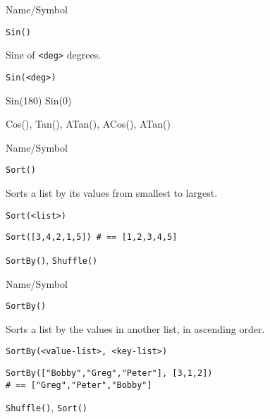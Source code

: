 \rl


\begin{desc}{Name/Symbol}
\item[Name/Symbol]  	\verb+Sin()+

\item[Description]  	Sine of \verb+<deg>+ degrees.

\item[Usage]        	
\begin{verbatim}
Sin(<deg>)
\end{verbatim}
Sin(180)
Sin(0)
\item[Example]

\item[See Also]    	Cos(), Tan(), ATan(), ACos(), ATan() 
\end{desc}

\rl


\begin{desc}{Name/Symbol}
\item[Name/Symbol] 	\verb+Sort()+

\item[Description] 	Sorts a list by its values from smallest to largest.

\item[Usage]       	
\begin{verbatim}
Sort(<list>)
\end{verbatim}

\item[Example]
\begin{verbatim}
Sort([3,4,2,1,5]) # == [1,2,3,4,5]
\end{verbatim}

\item[See Also]    	\verb+SortBy()+, \verb+Shuffle()+
\end{desc}

\rl


\begin{desc}{Name/Symbol}
\item[Name/Symbol] 	\verb+SortBy()+

\item[Description] 	Sorts a list by the values in another list, in ascending
		order.

\item[Usage]
\begin{verbatim}
SortBy(<value-list>, <key-list>)
\end{verbatim}

\item[Example]
\begin{verbatim}
SortBy(["Bobby","Greg","Peter"], [3,1,2]) 
# == ["Greg","Peter","Bobby"]
\end{verbatim}

\item[See Also]    	\verb+Shuffle()+, \verb+Sort()+
\end{desc}


